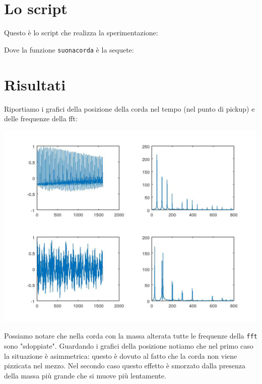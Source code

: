 \documentclass{article}
\begin{document}
	\section{Lo script}
	Questo è lo script che realizza la sperimentazione:
	
	
	
	Dove la funzione {\tt suonacorda} è la sequete:
	
	
	
	\section{Risultati}
	
	Riportiamo i grafici della posizione della corda nel tempo (nel punto di pickup) e delle frequenze della fft:
	
	\includegraphics[width=\textwidth]{vib-1.jpeg}
	
	Possiamo notare che nella corda con la massa alterata tutte le frequenze della {\tt fft} sono "sdoppiate". Guardando i grafici della posizione notiamo che nel primo caso la situazione è asimmetrica: questo è dovuto al fatto che la corda non viene pizzicata nel mezzo. Nel secondo caso questo effetto è smorzato dalla presenza della massa più grande che si muove più lentamente.
	
	
\end{document}
